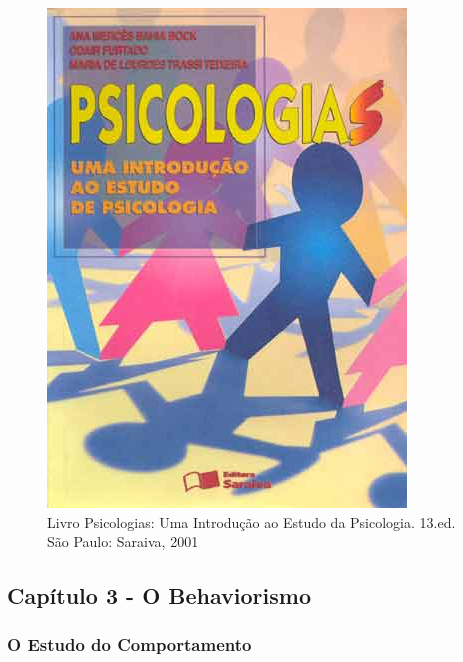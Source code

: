 \documentclass[
]{book}
\begin{document}
\begin{figure}

{\centering \includegraphics[width=0.5\linewidth]{imagens/capa-livro-psicologias} 

}

\caption{Livro Psicologias: Uma Introdução ao Estudo da Psicologia. 13.ed. São Paulo: Saraiva, 2001}\label{fig:unnamed-chunk-2}
\end{figure}

\hypertarget{capuxedtulo-3---o-behaviorismo}{%
\subsection{Capítulo 3 - O Behaviorismo}\label{capuxedtulo-3---o-behaviorismo}}

\hypertarget{o-estudo-do-comportamento}{%
\subsubsection{O Estudo do Comportamento}\label{o-estudo-do-comportamento}}
\end{document}
